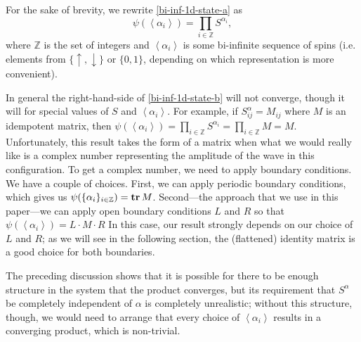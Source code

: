 \documentclass{article}
\newcommand{\seq}[1]{\left<#1\right>}
\newcommand{\tr}{\text{\textbf{tr}}\,}
\newcommand{\Z}{\mathbb{Z}}
\begin{document}
For the sake of brevity, we rewrite \eqref{bi-inf-1d-state-a} as
\begin{equation}
\label{bi-inf-1d-state-b}
\psi(\seq{\alpha_i}) = \prod_{i\in\Z} S^{\alpha_i},
\end{equation}
where $\Z$ is the set of integers and $\seq{\alpha_i}$ is some bi-infinite sequence of spins (i.e. elements from $\{\uparrow,\downarrow\}$ or $\{0,1\}$, depending on which representation is more convenient).

In general the right-hand-side of \eqref{bi-inf-1d-state-b} will not converge, though it will for special values of $S$ and $\seq{\alpha_i}$.  For example, if $S^\alpha_{ij}=M_{ij}$ where $M$ is an idempotent matrix, then $\psi(\seq{\alpha_i})=\prod_{i\in\Z} S^{\alpha_i} = \prod_{i\in\Z} M = M$.  Unfortunately, this result takes the form of a matrix when what we would really like is a complex number representing the amplitude of the wave in this configuration.  To get a complex number, we need to apply boundary conditions.  We have a couple of choices.  First, we can apply periodic boundary conditions, which gives us $\psi(\{\alpha_i\}_{i\in\Z})=\tr M$.  Second---the approach that we use in this paper---we can apply open boundary conditions $L$ and $R$ so that $\psi(\seq{\alpha_i})=L\cdot M\cdot R$  In this case, our result strongly depends on our choice of $L$ and $R$; as we will see in the following section, the (flattened) identity matrix is a good choice for both boundaries.

The preceding discussion shows that it is possible for there to be enough structure in the system that the product converges, but its requirement that $S^\alpha$ be completely independent of $\alpha$ is completely unrealistic;  without this structure, though, we would need to arrange that every choice of $\seq{\alpha_i}$ results in a converging product, which is non-trivial.
\end{document}
